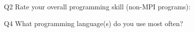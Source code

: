 \begin{description}%
\item{Q2} Rate your overall programming skill (non-MPI programs):%
\item{Q4} What programming language(s) do you use most often?%
\end{description}%
